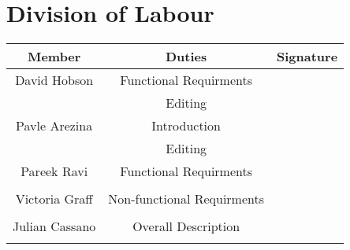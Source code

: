 \documentclass[12pt, titlepage]{article}
\newcommand\tab[1][1cm]{\hspace*{#1}}
\begin{document}

\appendix
\section{Division of Labour}
\label{sec:division_of_labour}
\begin{table}[h!]
\centering

\begin{tabular}{|c|c|c|}
\hline
{\bf Member} & {\bf Duties}&{\bf Signature}\\
\hline
{David Hobson} & {Functional Requirments } & {  \tab \tab \tab \tab}\\
{} & {Editing}  & {}\\
\hline
{Pavle Arezina} & {Introduction} & {}\\
{} & {Editing} & {}\\
\hline
{Pareek Ravi} & {Functional Requirments} & {}\\
{} & {} & {}\\
\hline
{Victoria Graff} & {Non-functional Requirments} & {}\\
{} & {} & {}\\
\hline
{Julian Cassano} & {Overall Description} & {}\\
{} & {} & {}\\
\hline
\end{tabular}

\end{table}
\end{document}
